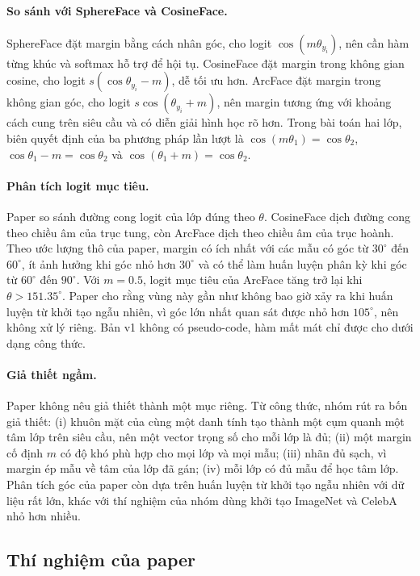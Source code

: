 \documentclass[a4paper,12pt]{article}
\begin{document}
\paragraph{So sánh với SphereFace và CosineFace.} SphereFace đặt margin bằng cách nhân góc, cho logit $\cos(m\theta_{y_i})$, nên cần hàm từng khúc và softmax hỗ trợ để hội tụ. CosineFace đặt margin trong không gian cosine, cho logit $s(\cos\theta_{y_i}-m)$, dễ tối ưu hơn. ArcFace đặt margin trong không gian góc, cho logit $s\cos(\theta_{y_i}+m)$, nên margin tương ứng với khoảng cách cung trên siêu cầu và có diễn giải hình học rõ hơn. Trong bài toán hai lớp, biên quyết định của ba phương pháp lần lượt là $\cos(m\theta_1)=\cos\theta_2$, $\cos\theta_1-m=\cos\theta_2$ và $\cos(\theta_1+m)=\cos\theta_2$.

\paragraph{Phân tích logit mục tiêu.} Paper so sánh đường cong logit của lớp đúng theo $\theta$. CosineFace dịch đường cong theo chiều âm của trục tung, còn ArcFace dịch theo chiều âm của trục hoành. Theo ước lượng thô của paper, margin có ích nhất với các mẫu có góc từ $30^\circ$ đến $60^\circ$, ít ảnh hưởng khi góc nhỏ hơn $30^\circ$ và có thể làm huấn luyện phân kỳ khi góc từ $60^\circ$ đến $90^\circ$. Với $m = 0.5$, logit mục tiêu của ArcFace tăng trở lại khi $\theta > 151.35^\circ$. Paper cho rằng vùng này gần như không bao giờ xảy ra khi huấn luyện từ khởi tạo ngẫu nhiên, vì góc lớn nhất quan sát được nhỏ hơn $105^\circ$, nên không xử lý riêng. Bản v1 không có pseudo-code, hàm mất mát chỉ được cho dưới dạng công thức.

\paragraph{Giả thiết ngầm.} Paper không nêu giả thiết thành một mục riêng. Từ công thức, nhóm rút ra bốn giả thiết: (i) khuôn mặt của cùng một danh tính tạo thành một cụm quanh một tâm lớp trên siêu cầu, nên một vector trọng số cho mỗi lớp là đủ; (ii) một margin cố định $m$ có độ khó phù hợp cho mọi lớp và mọi mẫu; (iii) nhãn đủ sạch, vì margin ép mẫu về tâm của lớp đã gán; (iv) mỗi lớp có đủ mẫu để học tâm lớp. Phân tích góc của paper còn dựa trên huấn luyện từ khởi tạo ngẫu nhiên với dữ liệu rất lớn, khác với thí nghiệm của nhóm dùng khởi tạo ImageNet và CelebA nhỏ hơn nhiều.

\subsection{Thí nghiệm của paper}
\end{document}
